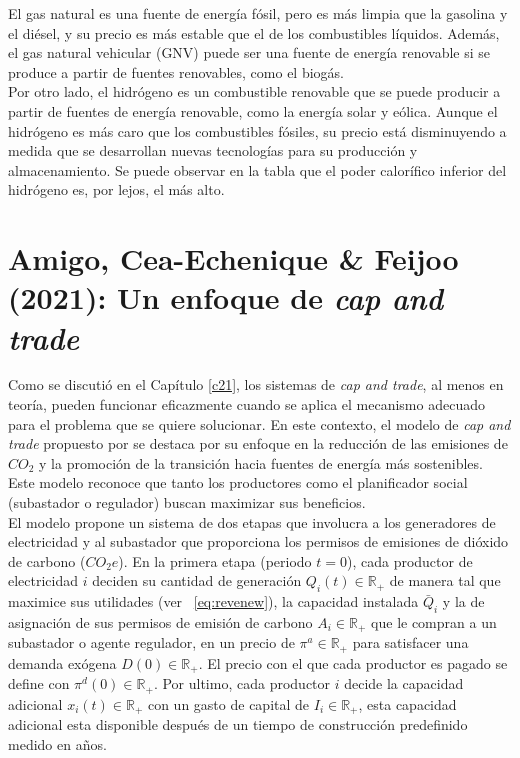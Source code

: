 El gas natural es una fuente de energía fósil, pero es más limpia que la gasolina y el diésel, y su precio es más estable que el de los combustibles líquidos. Además, el gas natural vehicular (GNV) puede ser una fuente de energía renovable si se produce a partir de fuentes renovables, como el biogás.\\

Por otro lado, el hidrógeno es un combustible renovable que se puede producir a partir de fuentes de energía renovable, como la energía solar y eólica. Aunque el hidrógeno es más caro que los combustibles fósiles, su precio está disminuyendo a medida que se desarrollan nuevas tecnologías para su producción y almacenamiento. Se puede observar en la tabla que el poder calorífico inferior del hidrógeno es, por lejos, el más alto.\\

\section{Amigo, Cea-Echenique \& Feijoo (2021): Un enfoque de \textit{cap and trade}}\label{c24}

Como se discutió en el Capítulo \ref{c21}, los sistemas de \textit{cap and trade}, al menos en teoría, pueden funcionar eficazmente cuando se aplica el mecanismo adecuado para el problema que se quiere solucionar. En este contexto, el modelo de \textit{cap and trade} propuesto por  se destaca por su enfoque en la reducción de las emisiones de $CO_2$ y la promoción de la transición hacia fuentes de energía más sostenibles. Este modelo reconoce que tanto los productores como el planificador social (subastador o regulador) buscan maximizar sus beneficios.\\

El modelo propone un sistema de dos etapas que involucra a los generadores de electricidad y al subastador que proporciona los permisos de emisiones de dióxido de carbono ($CO_2 e$). En la primera etapa (periodo $t=0$), cada productor de electricidad $i$ deciden su cantidad de generación $Q_i(t)\in\mathbb{R}_+$ de manera tal que maximice sus utilidades (ver ~\ref{eq:revenew}), la capacidad instalada $\bar{Q}_i$ y la de asignación de sus permisos de emisión de carbono $A_i\in\mathbb{R}_+$ que le compran a un subastador o agente regulador, en un precio de $\pi^{a}\in\mathbb{R}_+$  para satisfacer una demanda exógena $D(0)\in\mathbb{R}_+$. El precio con el que cada productor es pagado se define con $\pi^d(0)\in\mathbb{R}_+$. Por ultimo, cada productor $i$ decide la capacidad adicional $x_i(t)\in\mathbb{R}_+$ con un gasto de capital de $I_i\in\mathbb{R}_+$, esta capacidad adicional esta disponible después de un tiempo de construcción predefinido medido en años.\\

